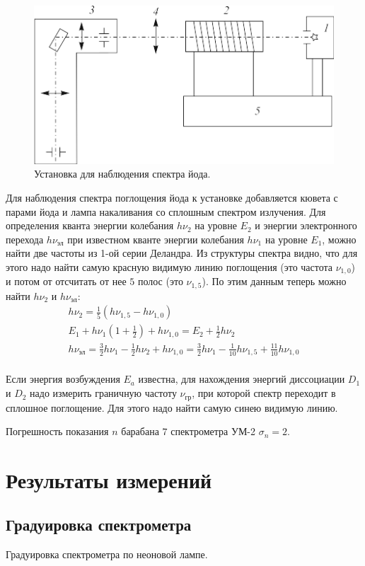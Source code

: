 \documentclass[12pt]{article}
\begin{document}
\begin{figure}[H]
    \caption{Установка для наблюдения спектра йода.}
    \centering
    \includegraphics[width=0.5\linewidth]{iodine.png}
\end{figure}

Для наблюдения спектра поглощения йода к установке добавляется кювета с парами йода и лампа накаливания
со сплошным спектром излучения. Для определения кванта энергии колебания $h \nu_2$ на уровне $E_2$ и энергии электронного
перехода $h \nu_{\text{эл}}$ при известном кванте энергии колебания $h \nu_1$ на уровне $E_1$,
можно найти две частоты из 1-ой серии Деландра.
Из структуры спектра видно, что для этого надо найти самую красную видимую линию поглощения (это частота $\nu_{1, 0}$)
и потом от отсчитать от нее $5$ полос (это $\nu_{1, 5}$).
По этим данным теперь можно найти $h \nu_2$ и $h \nu_{\text{эл}}$:
\begin{gather*}
    h \nu_2 = \frac{1}{5} \left( h \nu_{1,5} - h \nu_{1, 0} \right) \\
    E_1 + h \nu_1(1 + \frac{1}{2}) + h \nu_{1, 0} = E_2 + \frac{1}{2} h \nu_2 \\
    h \nu_{\text{эл}} =
        \frac{3}{2} h \nu_1 - \frac{1}{2} h \nu_2 + h \nu_{1, 0} =
        \frac{3}{2} h \nu_1 - \frac{1}{10} h \nu_{1,5} + \frac{11}{10} h \nu_{1, 0}
        \\
\end{gather*}

Если энергия возбуждения $E_a$ известна, для нахождения энергий диссоциации $D_1$ и $D_2$
надо измерить граничную частоту $\nu_{\text{гр}}$, при которой спектр переходит в сплошное поглощение.
Для этого надо найти самую синею видимую линию.

Погрешность показания $n$ барабана $7$ спектрометра УМ-2 $\sigma_n = 2$.

\section{Результаты измерений}
\subsection{Градуировка спектрометра}
\begin{table}[H]
\begin{center}
\caption{Градуировка спектрометра по неоновой лампе.}

\end{center}
\end{table}
\end{document}
